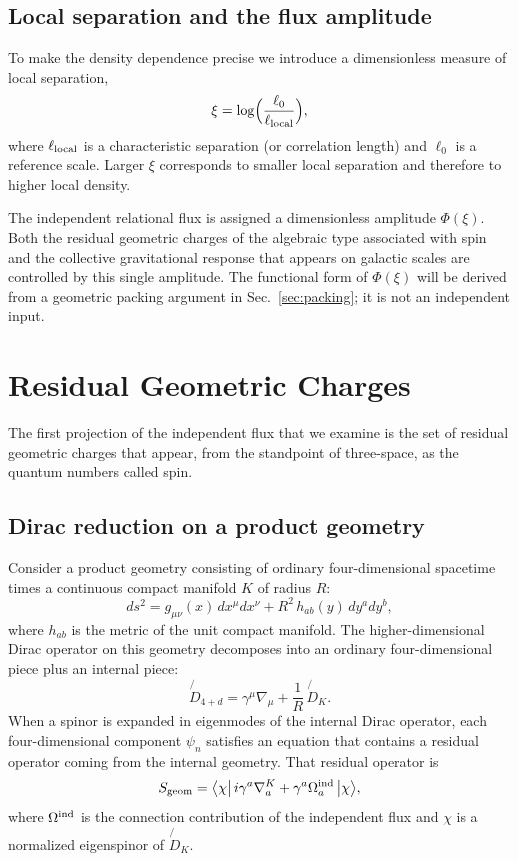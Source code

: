 \documentclass[11pt,a4paper]{article}
\begin{document}
\subsection{Local separation and the flux amplitude}

To make the density dependence precise we introduce a dimensionless measure of local separation,
\[
\xi=\log\Bigl(\frac{\ell_0}{\ell_{\rm local}}\Bigr),
\]
where \(\ell_{\rm local}\) is a characteristic separation (or correlation length) and \(\ell_0\) is a reference scale. Larger \(\xi\) corresponds to smaller local separation and therefore to higher local density.

The independent relational flux is assigned a dimensionless amplitude \(\Phi(\xi)\). Both the residual geometric charges of the algebraic type associated with spin and the collective gravitational response that appears on galactic scales are controlled by this single amplitude. The functional form of \(\Phi(\xi)\) will be derived from a geometric packing argument in Sec.~\ref{sec:packing}; it is not an independent input.

\section{Residual Geometric Charges}
\label{sec:residual-charges}

The first projection of the independent flux that we examine is the set of residual geometric charges that appear, from the standpoint of three-space, as the quantum numbers called spin.

\subsection{Dirac reduction on a product geometry}

Consider a product geometry consisting of ordinary four-dimensional spacetime times a continuous compact manifold \(K\) of radius \(R\):
\begin{equation}
ds^2=g_{\mu\nu}(x)\,dx^\mu dx^\nu+R^2\,h_{ab}(y)\,dy^a dy^b,
\label{eq:product}
\end{equation}
where \(h_{ab}\) is the metric of the unit compact manifold. The higher-dimensional Dirac operator on this geometry decomposes into an ordinary four-dimensional piece plus an internal piece:
\begin{equation}
\not{D}_{4+d}=\gamma^\mu\nabla_\mu+\frac1R\,\not{D}_K.
\label{eq:dirac-split}
\end{equation}
When a spinor is expanded in eigenmodes of the internal Dirac operator, each four-dimensional component \(\psi_n\) satisfies an equation that contains a residual operator coming from the internal geometry. That residual operator is
\begin{equation}
S_{\rm geom}=\bigl\langle\chi\big|\,i\gamma^a\nabla_a^K+\gamma^a\Omega_a^{\rm ind}\,\big|\chi\bigr\rangle,
\label{eq:Sgeom-def}
\end{equation}
where \(\Omega^{\rm ind}\) is the connection contribution of the independent flux and \(\chi\) is a normalized eigenspinor of \(\not{D}_K\).
\end{document}
